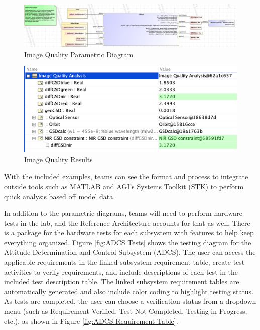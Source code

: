 \documentclass[conference]{joss-pretty}
\begin{document}
\begin{figure}
    \centering
    \includegraphics[width=\textwidth]{Figures/image quality.png}
    \caption{Image Quality Parametric Diagram}
    \label{fig:Image Quality Parametric Diagram}
\end{figure}

\begin{figure}
    \centering
    \includegraphics[width=\textwidth]{Figures/image quality results.png}
    \caption{Image Quality Results}
    \label{fig:Image Quality Results}
\end{figure}

With the included examples, teams can see the format and process to integrate outside tools such as MATLAB and AGI's Systems Toolkit (STK) to perform quick analysis based off model data. 

In addition to the parametric diagrams, teams will need to perform hardware tests in the lab, and the Reference Architecture accounts for that as well. There is a package for the hardware tests for each subsystem with features to help keep everything organized. Figure \ref{fig:ADCS Tests} shows the testing diagram for the Attitude Determination and Control Subsystem (ADCS). The user can access the applicable requirements in the linked subsystem requirement table, create test activities to verify requirements, and include descriptions of each test in the included test description table. The linked subsystem requirement tables are automatically generated and also include color coding to highlight testing status. As tests are completed, the user can choose a verification status from a dropdown menu (such as Requirement Verified, Test Not Completed, Testing in Progress, etc.), as shown in Figure \ref{fig:ADCS Requirement Table}. 
\end{document}
